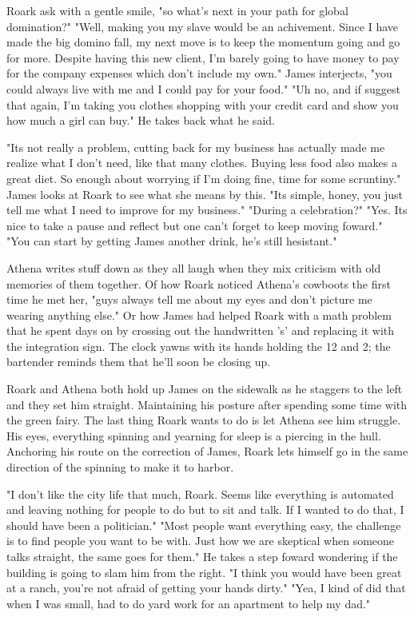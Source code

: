 		Roark ask with a gentle smile, "so what's next in your path for global domination?" "Well, making you my slave would be an 
	achivement. Since I have made the big domino fall, my next move is to keep the momentum going and go for more. Despite having this new client,
	I'm barely going to have money to pay for the company expenses which don't include my own." James interjects, "you could always live with me
	and I could pay for your food." "Uh no, and if suggest that again, I'm taking you clothes shopping with your credit card and show you how
	much a girl can buy." He takes back what he said. 

		"Its not really a problem, cutting back for my business has actually made me realize what I don't need, like that many clothes. Buying
	less food also makes a great diet. So enough about worrying if I'm doing fine, time for some scruntiny." James looks at Roark to see what she
	means by this. "Its simple, honey, you just tell me what I need to improve for my business." "During a celebration?" "Yes. Its nice to take
	a pause and reflect but one can't forget to keep moving foward." "You can start by getting James another drink, he's still hesistant."

		Athena writes stuff down as they all laugh when they mix criticism with old memories of them together. Of how Roark noticed Athena's
	cowboots the first time he met her, "guys always tell me about my eyes and don't picture me wearing anything else." Or how James had helped
	Roark with a math problem that he spent days on by crossing out the handwritten 's' and replacing it with the integration sign. The clock
	yawns with its hands holding the 12 and 2; the bartender reminds them that he'll soon be closing up. 

		Roark and Athena both hold up James on the sidewalk as he staggers to the left and they set him straight. Maintaining his posture 
	after spending some time with the green fairy. The last thing Roark wants to do is let Athena see him struggle. His eyes, everything spinning
	and yearning for sleep is a piercing in the hull. Anchoring his route on the correction of James, Roark lets himself go in the same direction
	of the spinning to make it to harbor.

		"I don't like the city life that much, Roark. Seems like everything is automated and leaving nothing for people to do but to sit and
	talk. If I wanted to do that, I should have been a politician." "Most people want everything easy, the challenge is to find people you want
	to be with. Just how we are skeptical when someone talks straight, the same goes for them." He takes a step foward wondering if the building
	is going to slam him from the right. "I think you would have been great at a ranch, you're not afraid of getting your hands dirty." "Yea,
	I kind of did that when I was small, had to do yard work for an apartment to help my dad."

